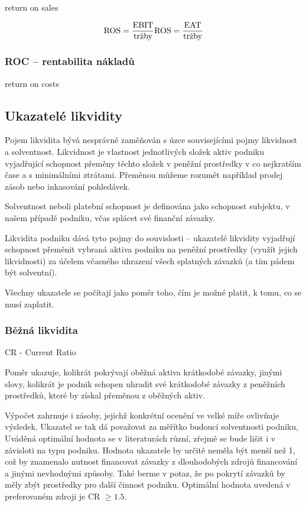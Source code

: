 return on sales

$$\text{ROS} = \dfrac{\text{EBIT}}{\text{tržby}} \text{ROS} = \dfrac{\text{EAT}}{\text{tržby}}$$ 

\subsubsection{ROC -- rentabilita nákladů}

return on costs


\subsection{Ukazatelé likvidity}
Pojem likvidita bývá nesprávně zaměňován s úzce souvisejícími pojmy likvidnost a solventnost. Likvidnost je vlastnost jednotlivých složek aktiv podniku vyjadřující schopnost přeměny těchto složek v peněžní prostředky v co nejkratším čase a s minimálními ztrátami\cite{uk_likv}. Přeměnou můžeme rozumět například prodej zásob nebo inkasování pohledávek. 

Solventnost neboli platební schopnost je definována jako schopnost subjektu, v našem případě podniku, včas splácet své finanční závazky.

Likvidita podniku dává tyto pojmy do souvislosti -- ukazatelé likvidity vyjadřují schopnost přeměnit vybraná aktiva podniku na peněžní prostředky (využít jejich likvidnosti) za účelem včasného uhrazení všech splatných závazků (a tím pádem být solventní).

Všechny ukazatele se počítají jako poměr toho, čím je možné platit, k tomu, co se musí zaplatit.

\subsubsection{Běžná likvidita} 

CR - Current Ratio

Poměr ukazuje, kolikrát pokrývají oběžná aktiva krátkodobé závazky, jinými slovy, kolikrát je podnik schopen uhradit své krátkodobé závazky z peněžních prostředků, které by získal přeměnou z oběžných aktiv.

Výpočet zahrnuje i zásoby, jejichž konkrétní ocenění ve velké míře ovlivňuje výsledek.
Ukazatel se tak dá považovat za měřítko budoucí solventnosti podniku, Uváděná optimální hodnota se v literaturách různí, zřejmě se bude lišit i v závisloti na typu podniku. Hodnota ukazatele by určitě neměla být menší než 1, což by znamenalo nutnost financovat závazky z dlouhodobých zdrojů financování a jinými nevhodnými způsoby. Také berme v potaz, že po pokrytí závazků by měly zbýt prostředky pro další činnost podniku.
Optimální hodnota uvedená v preferovaném zdroji je CR $\geq 1.5$. 

